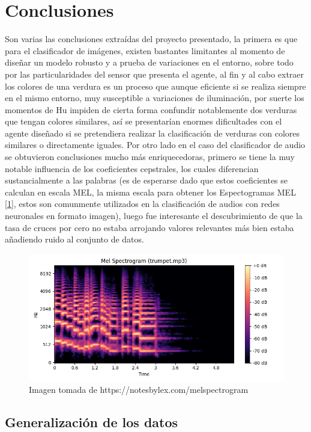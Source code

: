 \documentclass[12pt,a4paper]{article}
\begin{document}
\section{Conclusiones}
Son varias las conclusiones extraídas del proyecto presentado, la primera es que para el clasificador de imágenes, existen bastantes limitantes al momento de diseñar un modelo robusto y a prueba de variaciones en el entorno, sobre todo por las particularidades del sensor que presenta el agente, al fin y al cabo extraer los colores de una verdura es un proceso que aunque eficiente si se realiza siempre en el mismo entorno, muy susceptible a variaciones de iluminación, por suerte los momentos de Hu impiden de cierta forma confundir notablemente dos verduras que tengan colores similares, así se presentarían enormes dificultades con el agente diseñado si se pretendiera realizar la clasificación de verduras con colores similares o directamente iguales. Por otro lado en el caso del clasificador de audio se obtuvieron conclusiones mucho más enriquecedoras, primero se tiene la muy notable influencia de los coeficientes cepstrales, los cuales diferencian sustancialmente a las palabras (es de esperarse dado que estos coeficientes se calculan en escala MEL, la misma escala para obtener los Espectogramas MEL [\ref{fig:mel_img}], estos son comunmente utilizados en la clasificación de audios con redes neuronales en formato imagen), luego fue interesante el descubrimiento de que la tasa de cruces por cero no estaba arrojando valores relevantes más bien estaba añadiendo ruido al conjunto de datos.
\begin{figure}[h]
    \centering
    \includegraphics[width=0.75\linewidth]{mel_diagram.png}
    \caption{Imagen tomada de https://notesbylex.com/melspectrogram }
    \label{fig:mel_img}
\end{figure}
\subsection*{Generalización de los datos}
\end{document}
